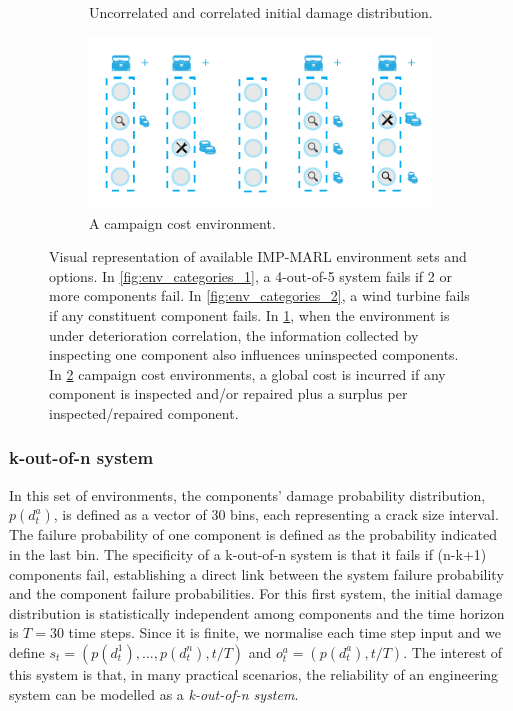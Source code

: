 \begin{figure}
\begin{subfigure}[t]{0.53\textwidth}
    \caption{Uncorrelated and correlated initial damage distribution.}
    \label{fig:env_categories_3}
\end{subfigure}%
\begin{subfigure}[t]{0.47\textwidth}
\centering
    \includegraphics[width=1\linewidth]{tex_thesis/figures/ch5/fig2_mul/environments_v2_d.pdf}
    \caption{A campaign cost environment.}
    \label{fig:env_categories_4}
\end{subfigure}
\caption{
Visual representation of available IMP-MARL environment sets and options.
In \ref{fig:env_categories_1}, a 4-out-of-5 system fails if 2 or more components fail.
In \ref{fig:env_categories_2}, a wind turbine fails if any constituent component fails.
In \ref{fig:env_categories_3}, when the environment is under deterioration correlation, the information collected by inspecting one component also influences uninspected components.
In \ref{fig:env_categories_4} campaign cost environments, a global cost is incurred if any component is inspected and/or repaired plus a surplus per inspected/repaired component. 
}
\label{fig:env_categories}
\end{figure}

\subsubsection{k-out-of-n system}
In this set of environments, the components' damage probability distribution, $p(d^a_t)$, is defined as a vector of 30 bins, each representing a crack size interval.
The failure probability of one component is defined as the probability indicated in the last bin.
The specificity of a k-out-of-n system is that it fails if (n-k+1) components fail, establishing a direct link between the system failure probability and the component failure probabilities.
For this first system, the initial damage distribution is statistically independent among components and the time horizon is $T=30$ time steps.
Since it is finite, we normalise each time step input and we define $s_t = (p(d^1_t),..., p(d^n_t), t/T)$ and $o^a_t=(p(d^a_t), t/T)$.
The interest of this system is that, in many practical scenarios, the reliability of an engineering system can be modelled as a \textit{k-out-of-n system}.

